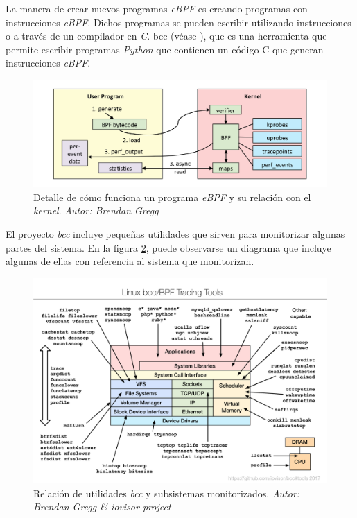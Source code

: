 La manera de crear nuevos programas \emph{eBPF} es creando programas con instrucciones \emph{eBPF}. Dichos programas se pueden escribir utilizando
instrucciones o a través de un compilador en \emph{C}. bcc (véase \cite{bcc-project}), que es una herramienta que permite escribir programas \emph{Python} que contienen un código C que generan 
instrucciones \emph{eBPF}.

\begin{figure}[h]
  \centering
    \includegraphics[scale=0.3]{images/linux_ebpf_internals}
  \caption{Detalle de cómo funciona un programa \emph{eBPF} y su relación con el \emph{kernel}. \emph{Autor: Brendan Gregg}}
  \label{fig:ebpf-internals}
\end{figure}

El proyecto \emph{bcc} incluye pequeñas utilidades que sirven para monitorizar algunas partes del sistema. En la figura \ref{fig:bcc-tracing-tools}, puede observarse un diagrama que incluye algunas de ellas
con referencia al sistema que monitorizan.

\begin{figure}[h]
  \centering
    \includegraphics[scale=0.65]{images/bcc_tracing_tools}
  \caption{Relación de utilidades \emph{bcc} y subsistemas monitorizados. \emph{Autor: Brendan Gregg \& iovisor project}}
  \label{fig:bcc-tracing-tools}
\end{figure}


